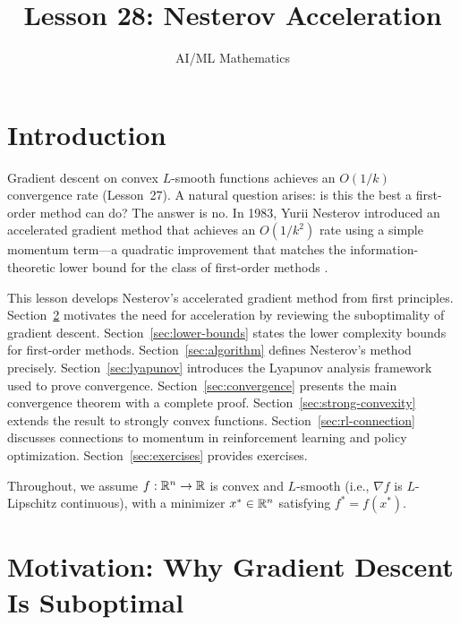 \documentclass[11pt,a4paper]{article}
\title{Lesson 28: Nesterov Acceleration}
\author{AI/ML Mathematics}
\date{}
\begin{document}
\maketitle
\tableofcontents
\newpage


\section{Introduction}\label{sec:intro}

Gradient descent on convex $L$-smooth functions achieves an $O(1/k)$
convergence rate (Lesson~27). A natural question arises: is this the best
a first-order method can do? The answer is no. In 1983, Yurii Nesterov
introduced an accelerated gradient method that achieves an $O(1/k^2)$
rate using a simple momentum term---a quadratic improvement that matches
the information-theoretic lower bound for the class of first-order
methods \citep{nesterov1983}.

This lesson develops Nesterov's accelerated gradient method from
first principles. Section~\ref{sec:motivation} motivates the need for
acceleration by reviewing the suboptimality of gradient descent.
Section~\ref{sec:lower-bounds} states the lower complexity bounds for
first-order methods. Section~\ref{sec:algorithm} defines Nesterov's
method precisely. Section~\ref{sec:lyapunov} introduces the Lyapunov
analysis framework used to prove convergence.
Section~\ref{sec:convergence} presents the main convergence theorem
with a complete proof. Section~\ref{sec:strong-convexity} extends the
result to strongly convex functions.
Section~\ref{sec:rl-connection} discusses connections to momentum in
reinforcement learning and policy optimization.
Section~\ref{sec:exercises} provides exercises.

Throughout, we assume $f : \mathbb{R}^n \to \mathbb{R}$ is convex and $L$-smooth
(i.e., $\nabla f$ is $L$-Lipschitz continuous), with a minimizer
$x^* \in \mathbb{R}^n$ satisfying $f^* = f(x^*)$.


\section{Motivation: Why Gradient Descent Is Suboptimal}\label{sec:motivation}
\end{document}
